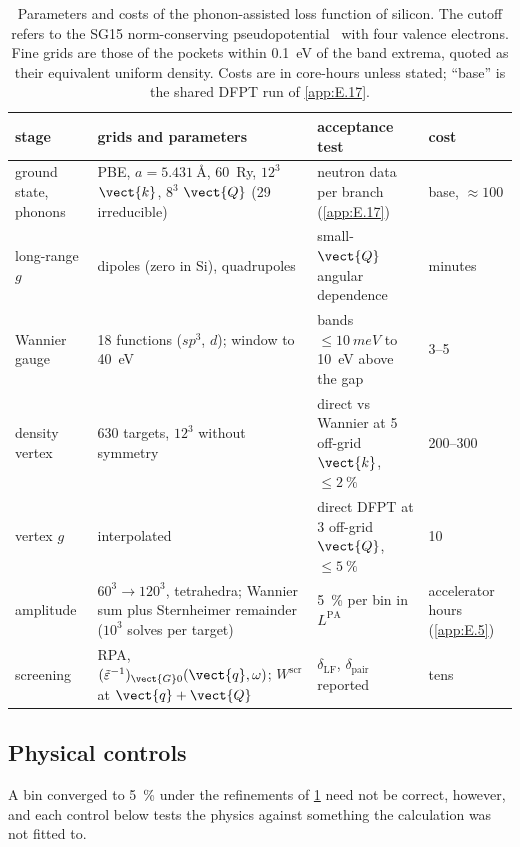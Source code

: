 \begin{table}[t]
  \centering
  \caption{Parameters and costs of the phonon-assisted loss function of silicon. The cutoff refers to the SG15 norm-conserving pseudopotential~\cite{schlipf2015optimization} with four valence electrons. Fine grids are those of the pockets within \SI{0.1}{eV} of the band extrema, quoted as their equivalent uniform density. Costs are in core-hours unless stated; ``base'' is the shared DFPT run of \cref{app:E.17}.}
  \label{tab:E14-params}
  \small
  \setlength{\tabcolsep}{4pt}
  \begin{tabular}{p{}p{}p{}p{}}
    \toprule
    stage & grids and parameters & acceptance test & cost \\
    \midrule
    ground state, phonons & PBE, $a = \SI{5.431}{\angstrom}$, \SI{60}{Ry}, $12^3$ $\vect{k}$, $8^3$ $\vect{Q}$ (29 irreducible) & neutron data per branch (\cref{app:E.17}) & base, $\approx 100$ \\
    long-range $g$ & dipoles (zero in Si), quadrupoles & small-$\vect{Q}$ angular dependence & minutes \\
    Wannier gauge & 18 functions ($sp^3$, $d$); window to \SI{40}{eV} & bands $\le\SI{10}{meV}$ to \SI{10}{eV} above the gap & 3--5 \\
    density vertex & 630 targets, $12^3$ without symmetry & direct vs Wannier at 5 off-grid $\vect{k}$, $\le\SI{2}{\percent}$ & 200--300 \\
    vertex $g$ & interpolated & direct DFPT at 3 off-grid $\vect{Q}$, $\le\SI{5}{\percent}$ & 10 \\
    amplitude & $60^3 \to 120^3$, tetrahedra; Wannier sum plus Sternheimer remainder ($10^3$ solves per target) & \SI{5}{\percent} per bin in $L^{\mathrm{PA}}$ & accelerator hours (\cref{app:E.5}) \\
    screening & RPA, $(\tilde\varepsilon^{-1})_{\vect{G}0}(\vect{q},\omega)$; $W^{\mathrm{scr}}$ at $\vect{q}+\vect{Q}$ & $\delta_{\mathrm{LF}}$, $\delta_{\mathrm{pair}}$ reported & tens \\
    \bottomrule
  \end{tabular}
\end{table}

\subsection{Physical controls}

A bin converged to \SI{5}{\percent} under the refinements of \cref{tab:E14-params} need not be correct, however, and each control below tests the physics against something the calculation was not fitted to.

